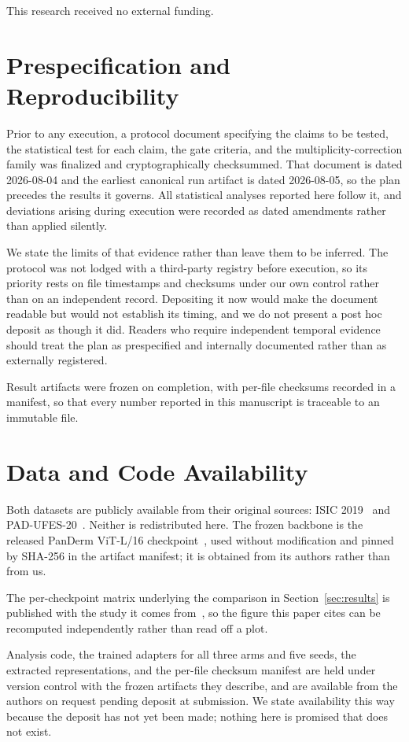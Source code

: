 This research received no external funding.

\section*{Prespecification and Reproducibility}

Prior to any execution, a protocol document specifying the claims to be tested,
the statistical test for each claim, the gate criteria, and the
multiplicity-correction family was finalized and cryptographically checksummed.
That document is dated 2026-08-04 and the earliest canonical run artifact is
dated 2026-08-05, so the plan precedes the results it governs. All statistical
analyses reported here follow it, and deviations arising during execution were
recorded as dated amendments rather than applied silently.

We state the limits of that evidence rather than leave them to be inferred. The
protocol was not lodged with a third-party registry before execution, so its
priority rests on file timestamps and checksums under our own control rather
than on an independent record. Depositing it now would make the document
readable but would not establish its timing, and we do not present a post hoc
deposit as though it did. Readers who require independent temporal evidence
should treat the plan as prespecified and internally documented rather than as
externally registered.

Result artifacts were frozen on completion, with per-file checksums recorded
in a manifest, so that every number reported in this manuscript is traceable
to an immutable file.

\section*{Data and Code Availability}

Both datasets are publicly available from their original sources: ISIC
2019~\cite{tschandl2018ham10000,hernandezperez2024bcn20000,codella2018isbi} and
PAD-UFES-20~\cite{pacheco2020padufes}. Neither is redistributed here. The
frozen backbone is the released PanDerm ViT-L/16
checkpoint~\cite{yan2025panderm}, used without modification and pinned by
SHA-256 in the artifact manifest; it is obtained from its authors rather than
from us.

The per-checkpoint matrix underlying the comparison in
Section~\ref{sec:results} is published with the study it comes
from~\cite{tran2026decodable}, so the figure this paper cites can be recomputed
independently rather than read off a plot.

Analysis code, the trained adapters for all three arms and five seeds, the
extracted representations, and the per-file checksum manifest are held under
version control with the frozen artifacts they describe, and are available from
the authors on request pending deposit at submission. We state availability
this way because the deposit has not yet been made; nothing here is promised
that does not exist.
